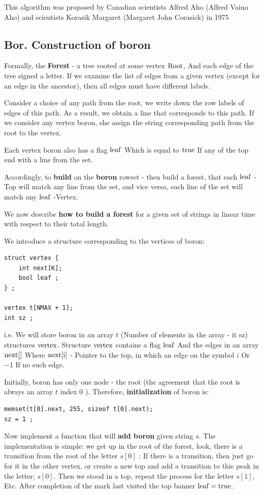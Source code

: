 This algorithm was proposed by Canadian scientists Alfred Aho (Alfred Vaino Aho) and scientists Korasik Margaret (Margaret John Corasick) in 1975

\subsection{ Bor. Construction of boron }

Formally, the \textbf{Forest} - a tree rooted at some vertex $\rm Root$, And each edge of the tree signed a letter. If we examine the list of edges from a given vertex (except for an edge in the ancestor), then all edges must have different labels.

Consider a choice of any path from the root, we write down the row labels of edges of this path. As a result, we obtain a line that corresponds to this path. If we consider any vertex boron, she assign the string corresponding path from the root to the vertex.

Each vertex boron also has a flag $\rm leaf$ Which is equal to $\rm true$ If any of the top end with a line from the set.

Accordingly, to \textbf{build} on the \textbf{boron} rowset - then build a forest, that each $\rm leaf$ -Top will match any line from the set, and vice versa, each line of the set will match any $\rm leaf$ -Vertex.

We now describe \textbf{how to build a forest} for a given set of strings in linear time with respect to their total length.

We introduce a structure corresponding to the vertices of boron:

\begin{verbatim}
struct vertex {
    int next[K];
    bool leaf ;
} ;
 
vertex t[NMAX + 1];
int sz ; 
\end{verbatim}
i.e. We will store boron in an array $t$ (Number of elements in the array - it sz) structures $\rm vertex$. Structure $\rm vertex$ contains a flag $\rm leaf$ And the edges in an array $\rm next []$ Where $\rm next [i]$ - Pointer to the top, in which an edge on the symbol $i$ Or $-1$ If no such edge.

Initially, boron has only one node - the root (the agreement that the root is always an array $t$ index $0$ ). Therefore, \textbf{initialization} of boron is:

\begin{verbatim}
memset(t[0].next, 255, sizeof t[0].next);
sz = 1 ; 
\end{verbatim}
Now implement a function that will \textbf{add boron} given string $s$. The implementation is simple: we get up in the root of the forest, look, there is a transition from the root of the letter $s [0]$ : If there is a transition, then just go for it in the other vertex, or create a new top and add a transition to this peak in the letter; $s [0]$. Then we stood in a top, repeat the process for the letter $s [1]$, Etc. After completion of the mark last visited the top banner $\rm leaf = true$.

